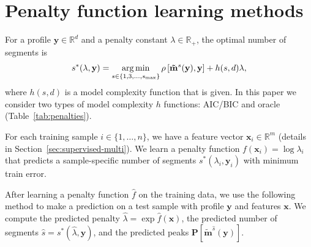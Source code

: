 \documentclass{article}
\DeclareMathOperator*{\argmin}{arg\,min}
\newcommand{\RR}{\mathbb R}
\begin{document}




\section{Penalty function learning methods}
\label{sec:penalty-learning}

For a profile $\mathbf y\in\RR^d$ and a penalty constant $\lambda\in\RR_+$, the
optimal number of segments is
\begin{equation}
  \label{eq:optimal_segments}
  s^*(\lambda, \mathbf y) =
  \argmin_{s\in\{1,3,\dots, s_{\text{\text{max}}}\}}
  \rho\left[
    \mathbf{\tilde m}^s(\mathbf y),
    \mathbf y
  \right]
  + h(s, d) \lambda,
\end{equation}
where $h(s, d)$ is a model complexity function that is given. In
this paper we consider two types of model complexity $h$ functions:
AIC/BIC and oracle (Table~\ref{tab:penalties}). 

For each training sample $i\in\{1,\dots, n\}$, we have a feature
vector $\mathbf x_i\in\RR^m$ (details in
Section~\ref{sec:supervised-multi}). We learn a penalty function
$f(\mathbf x_i) = \log \lambda_i$ that predicts a sample-specific
number of segments $s^*(\lambda_i, \mathbf y_i)$ with minimum train
error.

After learning a penalty function $\hat f$ on the training
data, we use the following method to make a prediction on a test
sample with profile $\mathbf y$ and features $\mathbf x$. We compute
the predicted penalty $\hat \lambda = \exp \hat f(\mathbf x)$, the
predicted number of segments $\hat s = s^*(\hat \lambda, \mathbf y)$,
and the predicted peaks $\mathbf P\left[ \mathbf{\tilde
    m}^{\hat s}(\mathbf y) \right]$.
\end{document}
